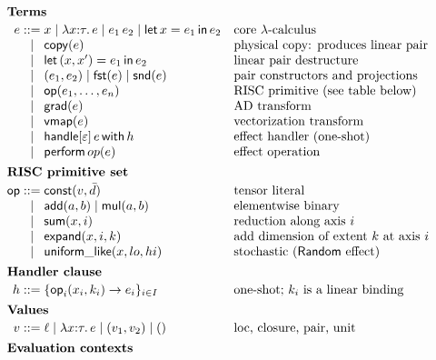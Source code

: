 \begin{figure}[t]
\small
\[
\begin{array}{r@{\;}c@{\;}l@{\quad}l}
\multicolumn{4}{l}{\textbf{Terms}} \\[2pt]
e & ::= & x \mid \lambda x{:}\tau.\, e \mid e_1\, e_2 \mid \letin{x = e_1}{e_2} & \text{core $\lambda$-calculus} \\
  & \mid & \mathsf{copy}(e) & \text{physical copy: produces linear pair} \\
  & \mid & \letpair{x}{x'}{e_1}{e_2} & \text{linear pair destructure} \\
  & \mid & (e_1, e_2) \mid \mathsf{fst}(e) \mid \mathsf{snd}(e) & \text{pair constructors and projections} \\
  & \mid & \mathsf{op}(e_1, \dots, e_n) & \text{RISC primitive (see table below)} \\
  & \mid & \mathsf{grad}(e) & \text{AD transform} \\
  & \mid & \mathsf{vmap}(e) & \text{vectorization transform} \\
  & \mid & \handlewith{\varepsilon}{e}{h} & \text{effect handler (one-shot)} \\
  & \mid & \performop{op}(e) & \text{effect operation} \\[4pt]
\multicolumn{4}{l}{\textbf{RISC primitive set}} \\[2pt]
\mathsf{op} & ::= & \mathsf{const}(v, \bar{d}) & \text{tensor literal} \\
            & \mid & \mathsf{add}(a, b) \mid \mathsf{mul}(a, b) & \text{elementwise binary} \\
            & \mid & \mathsf{sum}(x, i) & \text{reduction along axis $i$} \\
            & \mid & \mathsf{expand}(x, i, k) & \text{add dimension of extent $k$ at axis $i$} \\
            & \mid & \mathsf{uniform\_like}(x, lo, hi) & \text{stochastic ($\mathsf{Random}$ effect)} \\[4pt]
\multicolumn{4}{l}{\textbf{Handler clause}} \\[2pt]
h & ::= & \{ \mathsf{op}_i(x_i, k_i) \to e_i \}_{i \in I} & \text{one-shot; $k_i$ is a linear binding} \\[4pt]
\multicolumn{4}{l}{\textbf{Values}} \\[2pt]
v & ::= & \ell \mid \lambda x{:}\tau.\, e \mid (v_1, v_2) \mid () & \text{loc, closure, pair, unit} \\[4pt]
\multicolumn{4}{l}{\textbf{Evaluation contexts}} \\[2pt]

\end{array}\]
\end{figure}
